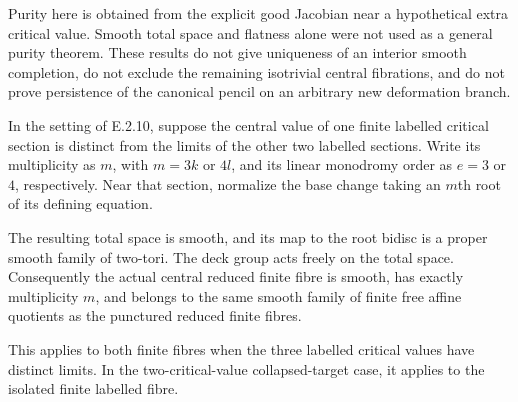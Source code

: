 \begin{remark}[Scope of E.2.11--E.2.12]
Purity here is obtained from the explicit good
Jacobian near a hypothetical extra critical value.
Smooth total space and flatness alone were not used
as a general purity theorem.  These results do not
give uniqueness of an interior smooth completion,
do not exclude the remaining isotrivial central
fibrations, and do not prove persistence of the
canonical pencil on an arbitrary new deformation
branch.
\end{remark}

\begin{proposition}
In the setting of E.2.10, suppose the central value of
one finite labelled critical section is distinct from
the limits of the other two labelled sections.  Write
its multiplicity as $m$, with $m=3k$ or $4l$, and its
linear monodromy order as $e=3$ or $4$, respectively.
Near that section, normalize the base change taking
an $m$th root of its defining equation.

The resulting total space is smooth, and its map to
the root bidisc is a proper smooth family of two-tori.
The deck group acts freely on the total space.
Consequently the actual central reduced finite fibre
is smooth, has exactly multiplicity $m$, and belongs
to the same smooth family of finite free affine
quotients as the punctured reduced finite fibres.

This applies to both finite fibres when the three
labelled critical values have distinct limits.  In
the two-critical-value collapsed-target case, it
applies to the isolated finite labelled fibre.
\end{proposition}
